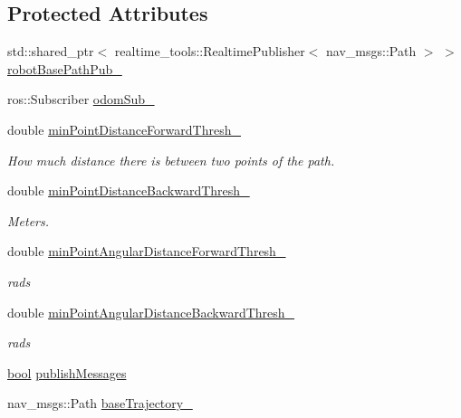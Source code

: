 \subsection*{Protected Attributes}
\begin{DoxyCompactItemize}
\item 
std\+::shared\+\_\+ptr$<$ realtime\+\_\+tools\+::\+Realtime\+Publisher$<$ nav\+\_\+msgs\+::\+Path $>$ $>$ \hyperlink{classcl__move__base__z_1_1odom__tracker_1_1OdomTracker_a40a7cbb6bb6595e250e7c685c781613b}{robot\+Base\+Path\+Pub\+\_\+}
\item 
ros\+::\+Subscriber \hyperlink{classcl__move__base__z_1_1odom__tracker_1_1OdomTracker_ab55df0e91246e43dff80912dc35a4fee}{odom\+Sub\+\_\+}
\item 
double \hyperlink{classcl__move__base__z_1_1odom__tracker_1_1OdomTracker_a2a11c48d1da1f1c9b921ef37c8db6325}{min\+Point\+Distance\+Forward\+Thresh\+\_\+}
\begin{DoxyCompactList}\small\item\em How much distance there is between two points of the path. \end{DoxyCompactList}\item 
double \hyperlink{classcl__move__base__z_1_1odom__tracker_1_1OdomTracker_ac1c711aabcc005981c256f8f45c0555b}{min\+Point\+Distance\+Backward\+Thresh\+\_\+}
\begin{DoxyCompactList}\small\item\em Meters. \end{DoxyCompactList}\item 
double \hyperlink{classcl__move__base__z_1_1odom__tracker_1_1OdomTracker_a3567ebfbc56db63e0fad52e0c4936c30}{min\+Point\+Angular\+Distance\+Forward\+Thresh\+\_\+}
\begin{DoxyCompactList}\small\item\em rads \end{DoxyCompactList}\item 
double \hyperlink{classcl__move__base__z_1_1odom__tracker_1_1OdomTracker_a2d166d65e97d4aa7851c45fd81985a85}{min\+Point\+Angular\+Distance\+Backward\+Thresh\+\_\+}
\begin{DoxyCompactList}\small\item\em rads \end{DoxyCompactList}\item 
\hyperlink{classbool}{bool} \hyperlink{classcl__move__base__z_1_1odom__tracker_1_1OdomTracker_a4f253d45ab5750dee3c2f18dd5599725}{publish\+Messages}
\item 
nav\+\_\+msgs\+::\+Path \hyperlink{classcl__move__base__z_1_1odom__tracker_1_1OdomTracker_a466d18a86df049f0f680e043bb5ea91f}{base\+Trajectory\+\_\+}

\end{DoxyCompactItemize}
